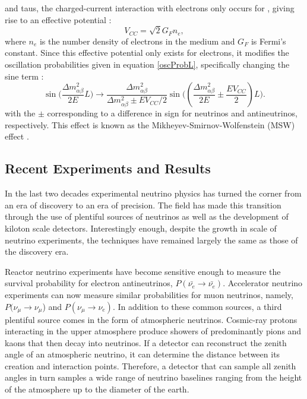 and taus, the charged-current interaction with electrons only occurs for \nue,
giving rise to an effective potential \cite{ho2010elementary}:
\begin{equation}
\label{veff}
V_{CC} = \sqrt{2}G_F n_e,
\end{equation}
where $n_e$ is the number density of electrons in the medium and $G_F$ is
Fermi's constant.
Since this effective potential only exists for electrons, it modifies the
oscillation probabilities given in equation \eqref{oscProbL}, specifically
changing the sine term \cite{ho2010elementary}:
\begin{equation}
\label{modSin}
\sin\bigg(\frac{\Delta m_{\alpha\beta}^2}{2E}L\bigg) \rightarrow
\frac{\Delta m_{\alpha\beta}^2}{\Delta m_{\alpha\beta}^2 \pm E V_{CC}/2} \sin\bigg((\frac{\Delta m_{\alpha\beta}^2}{2E} \pm \frac{EV_{CC}}{2})L \bigg).
\end{equation}
with the $\pm$ corresponding to a difference in sign for neutrinos and
antineutrinos, respectively.
This effect is known as the Mikheyev-Smirnov-Wolfenstein (MSW) effect
\cite{wolfenstein1978neutrino}.

\subsection{Recent Experiments and Results}
In the last two decades experimental neutrino physics has turned the corner
from an era of discovery to an era of precision.
The field has made this transition through the use of plentiful sources of
neutrinos as well as the development of kiloton scale detectors.
Interestingly enough, despite the growth in scale of neutrino experiments, the
techniques have remained largely the same as those of the discovery era.

Reactor neutrino experiments \cite{kamland, dayaBay, reno} have become
sensitive enough to measure the survival probability for electron
antineutrinos, $P(\bar{\nu_e} \rightarrow \bar{\nu_e})$.
Accelerator neutrino experiments \cite{minos13,abe2014observation,nova2015nue}
can now
measure similar probabilities for muon neutrinos, namely,
$P(\nu_\mu \rightarrow \nu_\mu$) and $P(\nu_\mu \rightarrow \nu_e)$.
In addition to these common sources, a third plentiful source comes in the form
of atmospheric neutrinos.
Cosmic-ray protons interacting in the upper atmosphere produce showers of
predominantly pions and kaons that then decay into neutrinos.
If a detector can reconstruct the zenith angle of an atmospheric neutrino, it
can determine the distance between its creation and interaction points.
Therefore, a detector that can sample all zenith angles in turn samples a wide
range of neutrino baselines ranging from the height of the atmosphere up to the
diameter of the earth.

